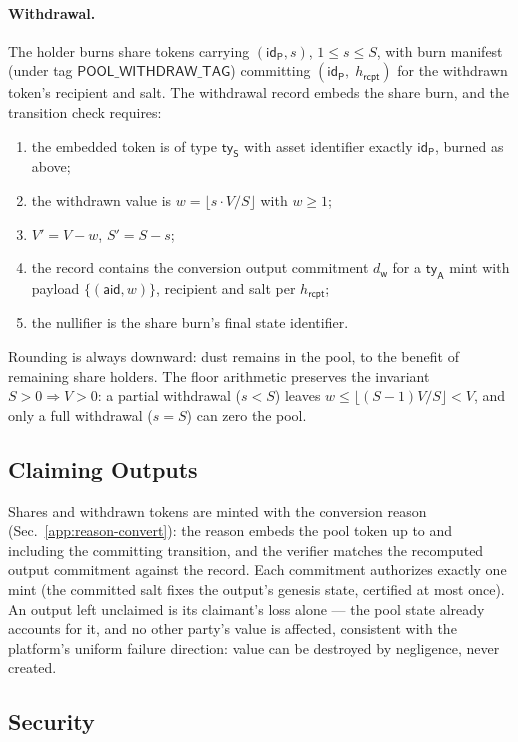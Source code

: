 \paragraph{Withdrawal.} The holder burns share tokens carrying $(\mathsf{id}_\mathsf{P}, s)$, $1 \le s \le S$, with burn manifest (under tag $\mathsf{POOL\_WITHDRAW\_TAG}$) committing $(\mathsf{id}_\mathsf{P},\; h_\mathsf{rcpt})$ for the withdrawn token's recipient and salt. The withdrawal record embeds the share burn, and the transition check requires:
\begin{enumerate}
	\item the embedded token is of type $\mathsf{ty}_\mathsf{S}$ with asset identifier exactly $\mathsf{id}_\mathsf{P}$, burned as above;
	\item the withdrawn value is $w = \lfloor s \cdot V / S \rfloor$ with $w \ge 1$;
	\item $V' = V - w$, $S' = S - s$;
	\item the record contains the conversion output commitment $d_\mathsf{w}$ for a $\mathsf{ty}_\mathsf{A}$ mint with payload $\{(\mathsf{aid}, w)\}$, recipient and salt per $h_\mathsf{rcpt}$;
	\item the nullifier is the share burn's final state identifier.
\end{enumerate}
Rounding is always downward: dust remains in the pool, to the benefit of remaining share holders. The floor arithmetic preserves the invariant $S > 0 \Rightarrow V > 0$: a partial withdrawal ($s < S$) leaves $w \le \lfloor (S-1)V/S \rfloor < V$, and only a full withdrawal ($s = S$) can zero the pool.

\subsection{Claiming Outputs}

Shares and withdrawn tokens are minted with the conversion reason (Sec.~\ref{app:reason-convert}): the reason embeds the pool token up to and including the committing transition, and the verifier matches the recomputed output commitment against the record. Each commitment authorizes exactly one mint (the committed salt fixes the output's genesis state, certified at most once). An output left unclaimed is its claimant's loss alone --- the pool state already accounts for it, and no other party's value is affected, consistent with the platform's uniform failure direction: value can be destroyed by negligence, never created.

\subsection{Security}

